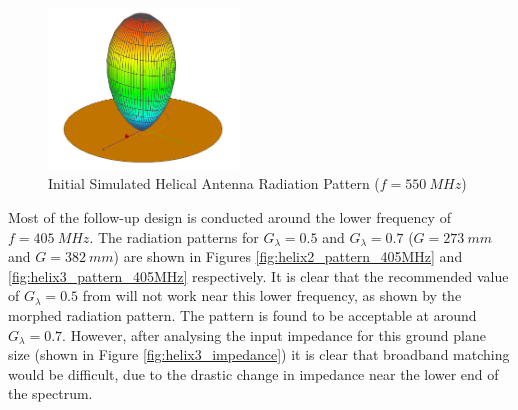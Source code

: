 \begin{figure}[!htb]
  \centering
  \includegraphics[width=0.45\textwidth]{helix1_pattern_550MHz}
  \caption{Initial Simulated Helical Antenna Radiation Pattern ($f=\SI{550}{MHz}$)}
  \label{fig:helix1_pattern_550MHz}
\end{figure}

Most of the follow-up design is conducted around the lower frequency of $f = \SI{405}{MHz}$. The radiation patterns for $G_\lambda = 0.5$ and $G_\lambda = 0.7$ ($G = \SI{273}{mm}$ and $G = \SI{382}{mm}$) are shown in Figures \ref{fig:helix2_pattern_405MHz} and \ref{fig:helix3_pattern_405MHz} respectively. It is clear that the recommended value of $G_\lambda = 0.5$ from \cite{textbook-antennaTheoryAnalysisDesign} will not work near this lower frequency, as shown by the morphed radiation pattern. The pattern is found to be acceptable at around $G_\lambda = 0.7$. However, after analysing the input impedance for this ground plane size (shown in Figure \ref{fig:helix3_impedance}) it is clear that broadband matching would be difficult, due to the drastic change in impedance near the lower end of the spectrum.

